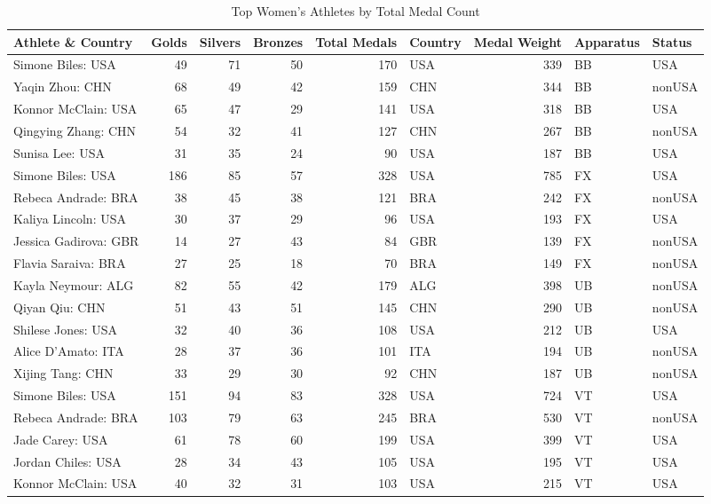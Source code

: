 \documentclass[
  10.5pt,
  letterpaper,
  DIV=11,
  numbers=noendperiod]{scrartcl}
\begin{document}
\begin{table}[H]

\caption{Top Women's Athletes by Total Medal Count}
\centering
\fontsize{8}{10}\selectfont
\begin{tabular}[t]{l|r|r|r|r|l|r|l|l}
\hline
Athlete \& Country & Golds & Silvers & Bronzes & Total Medals & Country & Medal Weight & Apparatus & Status\\
\hline
Simone Biles: USA & 49 & 71 & 50 & 170 & USA & 339 & BB & USA\\
\hline
Yaqin Zhou: CHN & 68 & 49 & 42 & 159 & CHN & 344 & BB & nonUSA\\
\hline
Konnor McClain: USA & 65 & 47 & 29 & 141 & USA & 318 & BB & USA\\
\hline
Qingying Zhang: CHN & 54 & 32 & 41 & 127 & CHN & 267 & BB & nonUSA\\
\hline
Sunisa Lee: USA & 31 & 35 & 24 & 90 & USA & 187 & BB & USA\\
\hline
Simone Biles: USA & 186 & 85 & 57 & 328 & USA & 785 & FX & USA\\
\hline
Rebeca Andrade: BRA & 38 & 45 & 38 & 121 & BRA & 242 & FX & nonUSA\\
\hline
Kaliya Lincoln: USA & 30 & 37 & 29 & 96 & USA & 193 & FX & USA\\
\hline
Jessica Gadirova: GBR & 14 & 27 & 43 & 84 & GBR & 139 & FX & nonUSA\\
\hline
Flavia Saraiva: BRA & 27 & 25 & 18 & 70 & BRA & 149 & FX & nonUSA\\
\hline
Kayla Neymour: ALG & 82 & 55 & 42 & 179 & ALG & 398 & UB & nonUSA\\
\hline
Qiyan Qiu: CHN & 51 & 43 & 51 & 145 & CHN & 290 & UB & nonUSA\\
\hline
Shilese Jones: USA & 32 & 40 & 36 & 108 & USA & 212 & UB & USA\\
\hline
Alice D'Amato: ITA & 28 & 37 & 36 & 101 & ITA & 194 & UB & nonUSA\\
\hline
Xijing Tang: CHN & 33 & 29 & 30 & 92 & CHN & 187 & UB & nonUSA\\
\hline
Simone Biles: USA & 151 & 94 & 83 & 328 & USA & 724 & VT & USA\\
\hline
Rebeca Andrade: BRA & 103 & 79 & 63 & 245 & BRA & 530 & VT & nonUSA\\
\hline
Jade Carey: USA & 61 & 78 & 60 & 199 & USA & 399 & VT & USA\\
\hline
Jordan Chiles: USA & 28 & 34 & 43 & 105 & USA & 195 & VT & USA\\
\hline
Konnor McClain: USA & 40 & 32 & 31 & 103 & USA & 215 & VT & USA\\
\hline
\end{tabular}
\end{table}
\end{document}
